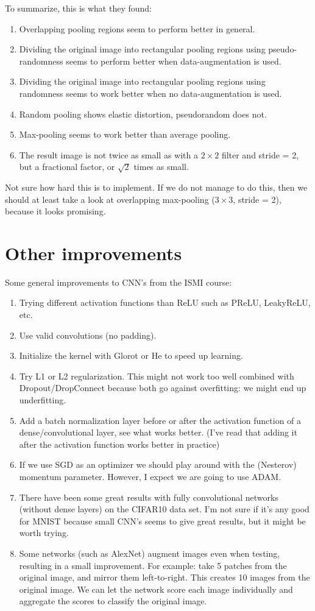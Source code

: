 \documentclass[a4paper, 11pt]{article}
\begin{document}
\noindent To summarize, this is what they found:
\begin{enumerate}[topsep=6pt,itemsep=3pt]
	\item Overlapping pooling regions seem to perform better in general.
	\item Dividing the original image into rectangular pooling regions using pseudo-randomness seems to perform better when data-augmentation is used.
	\item Dividing the original image into rectangular pooling regions using randomness seems to work better when no data-augmentation is used.
	\item Random pooling shows elastic distortion, pseudorandom does not.
	\item Max-pooling seems to work better than average pooling.
	\item The result image is not twice as small as with a $2\times2$ filter and stride = 2, but a fractional factor, or $\sqrt{2}$ times as small.
\end{enumerate}
Not sure how hard this is to implement.
If we do not manage to do this, then we should at least take a look at overlapping max-pooling ($3\times3$, stride = 2), because it looks promising.

\newpage
\section{Other improvements}
Some general improvements to CNN's from the ISMI course:
\begin{enumerate}[topsep=6pt,itemsep=3pt]
	\item Trying different activation functions than ReLU such as PReLU, LeakyReLU, etc.
	\item Use valid convolutions (no padding).
	\item Initialize the kernel with Glorot or He to speed up learning.
	\item Try L1 or L2 regularization.
	This might not work too well combined with Dropout/DropConnect because both go against overfitting: we might end up underfitting.
	\item Add a batch normalization layer before or after the activation function of a dense/convolutional layer, see what works better.
	(I've read that adding it after the activation function works better in practice)
	\item If we use SGD as an optimizer we should play around with the (Nesterov) momentum parameter.
	However, I expect we are going to use ADAM.
	\item There have been some great results with fully convolutional networks (without dense layers) on the CIFAR10 data set.
	I'm not sure if it's any good for MNIST because small CNN's seems to give great results, but it might be worth trying.
	\item Some networks (such as AlexNet) augment images even when testing, resulting in a small improvement.
	For example: take 5 patches from the original image, and mirror them left-to-right.
	This creates 10 images from the original image.
	We can let the network score each image individually and aggregate the scores to classify the original image.
\end{enumerate}
\end{document}
